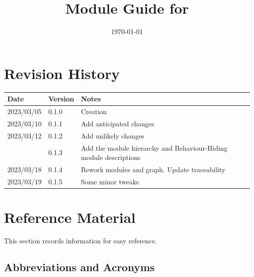 \documentclass[12pt, titlepage]{article}
\begin{document}
\title{Module Guide for \progname{}} 
\author{\authname}
\date{\today}

\maketitle


\section{Revision History}

\begin{tabularx}{\textwidth}{p{3cm}p{2cm}X}
\toprule {\bf Date} & {\bf Version} & {\bf Notes}\\
\midrule
2023/03/05 & 0.1.0 & Creation\\
2023/03/10 & 0.1.1 & Add anticipated changes\\
2023/03/12 & 0.1.2 & Add unlikely changes\\
           & 0.1.3 & Add the module hierarchy and Behaviour-Hiding module descriptions\\
2023/03/18 & 0.1.4 & Rework modules and graph. Update traceability\\
2023/03/19 & 0.1.5 & Some minor tweaks\\
\bottomrule
\end{tabularx}

\newpage

\section{Reference Material}

This section records information for easy reference.

\subsection{Abbreviations and Acronyms}
\end{document}
